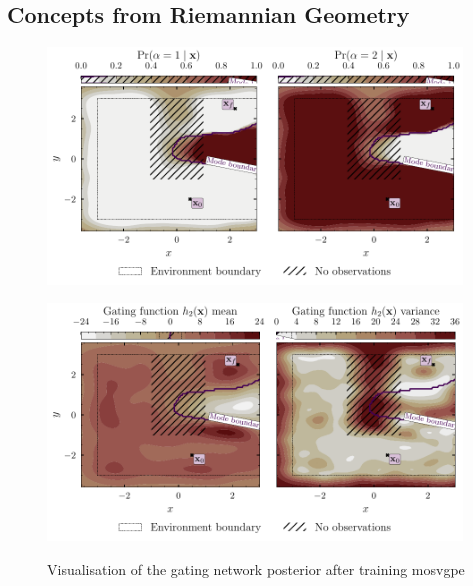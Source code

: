 \documentclass{mimosis-class/mimosis}
\numberwithin{equation}{chapter}
\begin{document}
{\subsection{Concepts from Riemannian Geometry \label{sec-geometry-recap}}
\label{sec:orge71d492}
\begin{figure}[h!]
\centering
\begin{minipage}[r]{\columnwidth}
\centering
\includegraphics[width=0.98\textwidth]{./images/mode-opt/env/scenario_7/mosvgpe/mixing_probs_no_obs.pdf}
\label{eq-traj-opt-gating-network-prob-post}
\end{minipage}
\begin{minipage}{1.0\textwidth}
\centering
\includegraphics[width=0.98\textwidth]{./images/mode-opt/env/scenario_7/mosvgpe/desired_gating_gp_no_obs.pdf}
\label{eq-traj-opt-gating-network-gp-post}
\end{minipage}
\caption[\acrshort{mosvgpe}'s gating network posterior after training on simulated quadcopoter data set]{
Visualisation of the gating network posterior after training \acrshort{mosvgpe}
}
\end{figure}}
\end{document}
